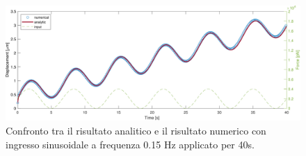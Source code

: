\begin{figure}[t!]
	\centering
	\includegraphics[width=0.95\linewidth]{../code/figs/harmoniclarge}
	\caption{Confronto tra il risultato analitico e il risultato numerico con ingresso sinusoidale a frequenza 0.15 Hz applicato per 40s.}
	\label{fig:harmoniclarge}
\end{figure}

